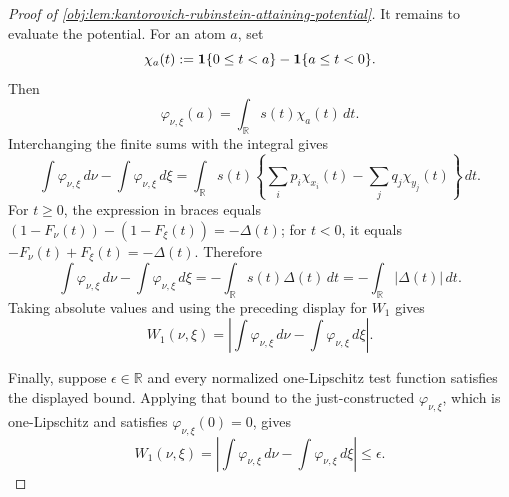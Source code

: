 \begin{proof}[Proof of \cref{obj:lem:kantorovich-rubinstein-attaining-potential}]
It remains to evaluate the potential.  For an atom \(a\), set
\[
\chi_a(t):=
{\bf 1}\{0\le t<a\}-{\bf 1}\{a\le t<0\}.
\]
Then
\[
\varphi_{\nu,\xi}(a)=\int_{\mathbb R}s(t)\chi_a(t)\,dt .
\]
Interchanging the finite sums with the integral gives
\[
\int \varphi_{\nu,\xi}\,d\nu-\int \varphi_{\nu,\xi}\,d\xi
=
\int_{\mathbb R}s(t)
\left\{
\sum_i p_i\chi_{x_i}(t)-\sum_j q_j\chi_{y_j}(t)
\right\}\,dt .
\]
For \(t\ge0\), the expression in braces equals
\((1-F_\nu(t))-(1-F_\xi(t))=-\Delta(t)\); for \(t<0\), it equals
\(-F_\nu(t)+F_\xi(t)=-\Delta(t)\).  Therefore
\[
\int \varphi_{\nu,\xi}\,d\nu-\int \varphi_{\nu,\xi}\,d\xi
=
-\int_{\mathbb R}s(t)\Delta(t)\,dt
=
-\int_{\mathbb R}|\Delta(t)|\,dt .
\]
Taking absolute values and using the preceding display for \(W_1\) gives
\[
W_1(\nu,\xi)
=
\left|
  \int \varphi_{\nu,\xi}\,d\nu
  -
  \int \varphi_{\nu,\xi}\,d\xi
\right|.
\]

Finally, suppose \(\epsilon\in\mathbb R\) and every normalized one-Lipschitz test function satisfies the displayed bound.  Applying that bound to the just-constructed \(\varphi_{\nu,\xi}\), which is one-Lipschitz and satisfies \(\varphi_{\nu,\xi}(0)=0\), gives
\[
W_1(\nu,\xi)
=
\left|
  \int \varphi_{\nu,\xi}\,d\nu
  -
  \int \varphi_{\nu,\xi}\,d\xi
\right|
\le \epsilon .
\]
\end{proof}
